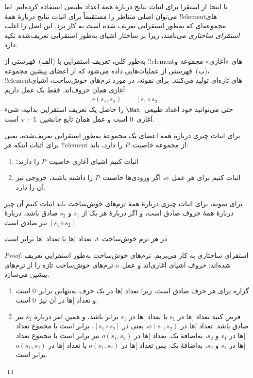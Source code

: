 \documentclass[../../../include/open-logic-section]{subfiles}
\begin{document}


تا اینجا از استقرا برای اثبات نتایج دربارهٔ همهٔ اعداد طبیعی استفاده
کرده‌ایم. اما می‌توان اصلی متناظر را مستقیماً برای اثبات نتایج دربارهٔ
همهٔ !!{element}های مجموعه‌ای که به‌طور استقرایی تعریف شده است به کار
برد. این اصل را اغلب \emph{استقرای ساختاری} می‌نامند، زیرا بر ساختار
اشیای به‌طور استقرایی تعریف‌شده تکیه دارد.

به‌طور کلی، تعریف استقرایی با (الف)~فهرستی از !!{element}های «آغازی»
مجموعه و (ب)~فهرستی از عملیات‌هایی داده می‌شود که از اعضای پیشین
مجموعه، !!{element}های تازه‌ای تولید می‌کنند. برای نمونه، در
مورد ترم‌های خوش‌ساخت، اشیای آغازی همان حروف‌اند. فقط یک عمل داریم:
\begin{align*}
  o(s_1, s_2) &= [s_1 \circ s_2]
\end{align*}
حتی می‌توانید خود اعداد طبیعی~$\Nat$ را حاصل یک تعریف استقرایی بدانید:
شیء آغازی~$0$ است و عمل همان تابع جانشین~$x + 1$ است.

برای اثبات چیزی دربارهٔ همهٔ اعضای یک مجموعهٔ به‌طور استقرایی
تعریف‌شده، یعنی برای اثبات اینکه هر !!{element} از مجموعه خاصیت~$P$ را
دارد، باید:
\begin{enumerate}
\item اثبات کنیم اشیای آغازی خاصیت~$P$ را دارند؛
\item اثبات کنیم برای هر عمل~$o$، اگر ورودی‌ها خاصیت~$P$ را داشته
  باشند، خروجی نیز آن را دارد.
\end{enumerate}
برای نمونه، برای اثبات چیزی دربارهٔ همهٔ ترم‌های خوش‌ساخت باید اثبات
کنیم آن چیز دربارهٔ همهٔ حروف صادق است، و اگر دربارهٔ هر یک از $s_1$
و $s_2$ صادق باشد، دربارهٔ $[s_1 \circ s_2]$ نیز صادق است.

\begin{prop}
  در هر ترم خوش‌ساخت~$t$، تعداد $[$ها با تعداد $]$ها برابر است.
\end{prop}

\begin{proof}
استقرای ساختاری به کار می‌بریم. ترم‌های خوش‌ساخت به‌طور استقرایی تعریف
شده‌اند: حروف اشیای آغازی‌اند و عمل~$o$ ترم‌های خوش‌ساخت تازه را از
ترم‌های پیشین می‌سازد.
\begin{enumerate}
\item گزاره برای هر حرف صادق است، زیرا تعداد $[$ها در یک حرف به‌تنهایی
  برابر~$0$ است و تعداد $]$ها در آن نیز~$0$ است.
\item فرض کنید تعداد $]$ها در $s_1$ با تعداد $[$ها در $s_1$ برابر
  باشد، و همین امر دربارهٔ $s_2$ نیز صادق باشد. تعداد $[$ها در
  $o(s_1, s_2)$، یعنی در $[s_1 \circ s_2]$، برابر است با مجموع تعداد
  $[$ها در $s_1$ و $s_2$، به‌اضافهٔ یک. تعداد $]$ها در $o(s_1, s_2)$
  نیز برابر است با مجموع تعداد $]$ها در $s_1$ و $s_2$، به‌اضافهٔ یک.
  پس تعداد $[$ها در $o(s_1, s_2)$ با تعداد $]$ها در $o(s_1,s_2)$
  برابر است.
\end{enumerate}
\end{proof}
\end{document}
